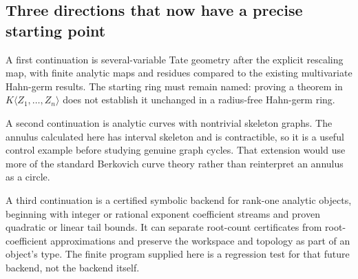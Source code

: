 \documentclass[11pt,a4paper]{article}
\numberwithin{equation}{section}
\theoremstyle{definition}
\theoremstyle{remark}
\begin{document}
\subsection{Three directions that now have a precise starting point}
A first continuation is several-variable Tate geometry after the explicit
rescaling map, with finite analytic maps and residues compared to the existing
multivariate Hahn-germ results. The starting ring must remain named: proving a
theorem in $K\langle Z_1,\ldots,Z_n\rangle$ does not establish it unchanged
in a radius-free Hahn-germ ring.

A second continuation is analytic curves with nontrivial skeleton graphs.
The annulus calculated here has interval skeleton and is contractible, so it is
a useful control example before studying genuine graph cycles. That extension
would use more of the standard Berkovich curve theory rather than reinterpret
an annulus as a circle.

A third continuation is a certified symbolic backend for rank-one analytic
objects, beginning with integer or rational exponent coefficient streams and
proven quadratic or linear tail bounds. It can separate root-count certificates
from root-coefficient approximations and preserve the workspace and topology as
part of an object's type. The finite program supplied here is a regression test
for that future backend, not the backend itself.

\appendix
\end{document}
